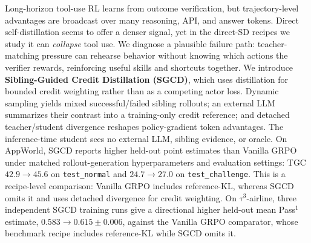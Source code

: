 Long-horizon tool-use RL learns from outcome verification, but trajectory-level
advantages are broadcast over many reasoning, API, and answer tokens. Direct
self-distillation seems to offer a denser signal, yet in the direct-SD recipes
we study it can \emph{collapse} tool use. We diagnose a plausible failure path:
teacher-matching pressure can rehearse behavior without knowing which actions
the verifier rewards, reinforcing useful skills and shortcuts together. We
introduce \textbf{Sibling-Guided Credit Distillation (SGCD)}, which
uses distillation for bounded credit weighting rather than as a competing actor
loss. Dynamic sampling yields mixed successful/failed sibling rollouts; an
external LLM summarizes their contrast into a training-only credit reference;
and detached teacher/student divergence reshapes policy-gradient token advantages. The
inference-time student sees no external LLM, sibling evidence, or oracle. On
AppWorld, SGCD reports higher held-out point estimates than Vanilla GRPO under
matched rollout-generation hyperparameters and evaluation settings:
TGC $42.9\to45.6$ on \texttt{test\_normal} and $24.7\to27.0$ on
\texttt{test\_challenge}. This is a recipe-level comparison: Vanilla GRPO
includes reference-KL, whereas SGCD omits it and uses detached divergence for
credit weighting. On $\tau^3$-airline, three independent SGCD training
runs give a directional higher held-out mean Pass$^1$ estimate,
$0.583\to0.615\pm0.006$,
against the Vanilla GRPO comparator, whose benchmark recipe includes
reference-KL while SGCD omits it.
